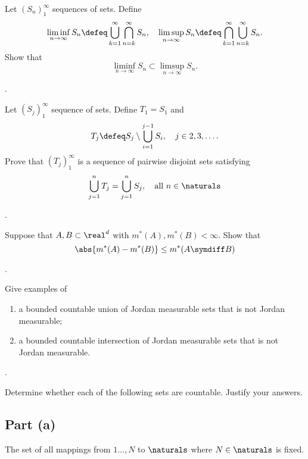 \documentclass{article}
\newcommand{\basedir}{../../}
\begin{document}

\integratedtitle

\problemsec

Let $(S_n)_1^\infty$ sequences of sets.
Define
\[
    \liminf_{n\to\infty} S_n\defeq \bigcup_{k=1}^\infty \bigcap_{n=k}^\infty S_n, \quad \limsup_{n\to\infty} S_n\defeq \bigcap_{k=1}^\infty \bigcup_{n=k}^\infty S_n.
\]
Show that
\[
    \liminf_{n\to\infty} S_n\subset \limsup_{n\to\infty} S_n. 
\]

\begin{solution}
    [Redacted].
\end{solution}

\problemsec
Let $(S_j)_1^\infty$ sequence of sets.
Define $T_1=S_1$ and
\[
    T_j\defeq S_j \setminus \bigcup_{i=1}^{j-1}S_i, \quad j\in 2,3, \ldots.
\]
Prove that $(T_j)_1^\infty$ is a sequence of pairwise disjoint sets satisfying
\[
    \bigcup_{j=1}^n T_j=\bigcup_{j=1}^n S_j, \quad \text{all }n\in\naturals
\]

\begin{solution}
    [Redacted].
\end{solution}

\problemsec
Suppose that $A, B\subset \real^d$ with $m^*(A),m^*(B)<\infty$.
Show that
\[
    \abs{m^*(A)-m^*(B)}\le m^*(A\symdiff B)
\]

\begin{solution}
    [Redacted].
\end{solution}

\problemsec
Give examples of
\begin{enumerate}
    \item a bounded countable union of Jordan measurable sets that is not Jordan measurable;
    \item a bounded countable intersection of Jordan measurable sets that is not Jordan measurable.
\end{enumerate}

\begin{solution}
    [Redacted].
\end{solution}

\problemsec
Determine whether each of the following sets are countable.
Justify your answers.

\subsection{Part (a)}
The set of all mappings from $1\ldots,N$ to $\naturals$ where $N\in\naturals$ is fixed.
\end{document}
